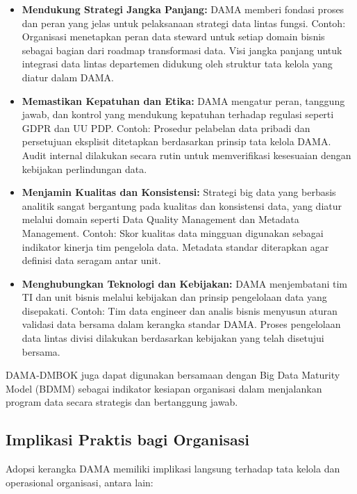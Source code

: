 \begin{itemize}
	\item \textbf{Mendukung Strategi Jangka Panjang:} DAMA memberi fondasi proses dan peran yang jelas untuk pelaksanaan strategi data lintas fungsi. Contoh: Organisasi menetapkan peran data steward untuk setiap domain bisnis sebagai bagian dari roadmap transformasi data. Visi jangka panjang untuk integrasi data lintas departemen didukung oleh struktur tata kelola yang diatur dalam DAMA.
	
	\item \textbf{Memastikan Kepatuhan dan Etika:} DAMA mengatur peran, tanggung jawab, dan kontrol yang mendukung kepatuhan terhadap regulasi seperti GDPR dan UU PDP. Contoh: Prosedur pelabelan data pribadi dan persetujuan eksplisit ditetapkan berdasarkan prinsip tata kelola DAMA. Audit internal dilakukan secara rutin untuk memverifikasi kesesuaian dengan kebijakan perlindungan data.
	
	\item \textbf{Menjamin Kualitas dan Konsistensi:} Strategi big data yang berbasis analitik sangat bergantung pada kualitas dan konsistensi data, yang diatur melalui domain seperti Data Quality Management dan Metadata Management. Contoh: Skor kualitas data mingguan digunakan sebagai indikator kinerja tim pengelola data. Metadata standar diterapkan agar definisi data seragam antar unit.
	
	\item \textbf{Menghubungkan Teknologi dan Kebijakan:} DAMA menjembatani tim TI dan unit bisnis melalui kebijakan dan prinsip pengelolaan data yang disepakati. Contoh: Tim data engineer dan analis bisnis menyusun aturan validasi data bersama dalam kerangka standar DAMA. Proses pengelolaan data lintas divisi dilakukan berdasarkan kebijakan yang telah disetujui bersama.
\end{itemize}


DAMA-DMBOK juga dapat digunakan bersamaan dengan Big Data Maturity Model (BDMM) sebagai indikator kesiapan organisasi dalam menjalankan program data secara strategis dan bertanggung jawab.

\subsection{Implikasi Praktis bagi Organisasi}

Adopsi kerangka DAMA memiliki implikasi langsung terhadap tata kelola dan operasional organisasi, antara lain:

